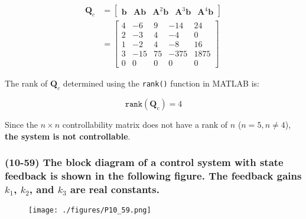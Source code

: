 \documentclass[12pt, letterpaper]{../assignment}
\begin{document}
\begin{equation*}
\begin{aligned} 
\textbf{Q}_c &= \left[\begin{array}{ccccc}
    \textbf{b} & \textbf{A}\textbf{b} & \textbf{A}^2\textbf{b} & \textbf{A}^3\textbf{b} & \textbf{A}^4\textbf{b} \end{array}\right]\\
             &= \left[\begin{array}{rrrrr}
                 4 &  -6 &  9 &  -14 &   24 \\
                 2 &  -3 &  4 &   -4 &    0 \\
                 1 &  -2 &  4 &   -8 &   16 \\
                 3 & -15 & 75 & -375 & 1875 \\
                 0 &   0 &  0 &    0 &    0
                \end{array}\right]
\end{aligned}   
\end{equation*}

The rank of $\textbf{Q}_c$ determined using the \texttt{rank()} function in MATLAB is:

$$ \texttt{rank}(\textbf{Q}_c ) = 4 $$

\begin{answer}
Since the $n \times n$ controllability matrix does not have a rank of $n$ ($n=5,n \neq 4$),
\textbf{the system is not controllable}.
\end{answer}

\subsubsection*{(10-59)
The block diagram of a control system with state feedback is shown in the following figure.
The feedback gains $k_1$, $k_2$, and $k_3$ are real constants.}

\begin{figure}[H]
    \centering
    \texttt{[image: ./figures/P10\_59.png]}
 \end{figure}




\end{document}
